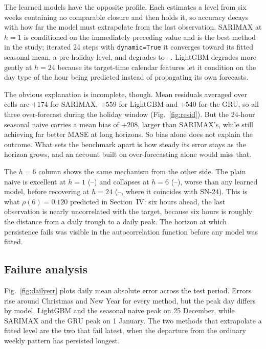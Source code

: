 \documentclass[conference,onecolumn,11pt]{IEEEtran}
\providecommand{\maseNaiveHOne}{--}
\providecommand{\maseNaiveHSix}{--}
\providecommand{\maseNaiveHDay}{--}
\providecommand{\maseSarimaHDay}{--}
\begin{document}
The learned models have the opposite profile. Each estimates a level from six weeks containing no comparable closure and then holds it, so accuracy decays with how far the model must extrapolate from the last observation. SARIMAX at $h{=}1$ is conditioned on the immediately preceding value and is the best method in the study; iterated 24 steps with \texttt{dynamic=True} it converges toward its fitted seasonal mean, a pre-holiday level, and degrades to \maseSarimaHDay{}. LightGBM degrades more gently at $h{=}24$ because its target-time calendar features let it condition on the day type of the hour being predicted instead of propagating its own forecasts.

The obvious explanation is incomplete, though. Mean residuals averaged over cells are $+174$ for SARIMAX, $+559$ for LightGBM and $+540$ for the GRU, so all three over-forecast during the holiday window (Fig.~\ref{fig:resid}). But the 24-hour seasonal naive carries a mean bias of $+208$, larger than SARIMAX's, while still achieving far better MASE at long horizons. So bias alone does not explain the outcome. What sets the benchmark apart is how steady its error stays as the horizon grows, and an account built on over-forecasting alone would miss that.

The $h{=}6$ column shows the same mechanism from the other side. The plain naive is excellent at $h{=}1$ (\maseNaiveHOne{}) and collapses at $h{=}6$ (\maseNaiveHSix{}), worse than any learned model, before recovering at $h{=}24$ (\maseNaiveHDay{}, where it coincides with SN-24). This is what $\rho(6)=0.120$ predicted in Section~IV: six hours ahead, the last observation is nearly uncorrelated with the target, because six hours is roughly the distance from a daily trough to a daily peak. The horizon at which persistence fails was visible in the autocorrelation function before any model was fitted.

\subsection{Failure analysis}
Fig.~\ref{fig:dailyerr} plots daily mean absolute error across the test period. Errors rise around Christmas and New Year for every method, but the peak day differs by model. LightGBM and the seasonal naive peak on 25 December, while SARIMAX and the GRU peak on 1 January. The two methods that extrapolate a fitted level are the two that fail latest, when the departure from the ordinary weekly pattern has persisted longest.
\end{document}
